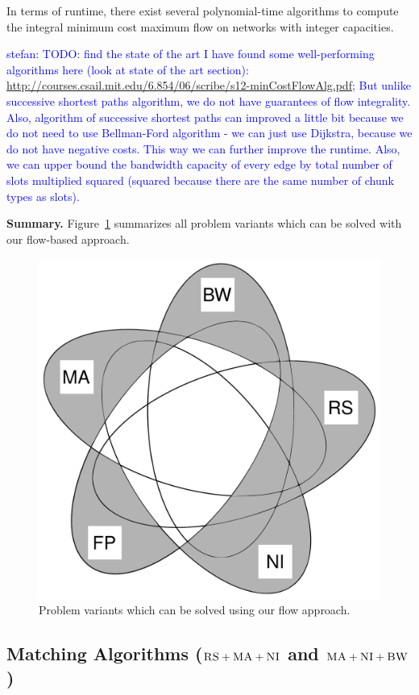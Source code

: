 \documentclass[9pt,twocolumn]{scrartcl}
\newcommand{\stefan}[1]{\textcolor{blue}{stefan: #1}}
\newcommand{\CC}{\textsc{NI}}
\newcommand{\RS}{\textsc{RS}}
\newcommand{\BW}{\textsc{BW}}
\newcommand{\MA}{\textsc{MA}}
\begin{document}
In terms of runtime, there exist several polynomial-time algorithms to compute
the integral minimum cost maximum flow on networks with integer capacities.

\stefan{TODO: find the state of the art
I have found some well-performing algorithms here (look at state of the art section):
  \url{http://courses.csail.mit.edu/6.854/06/scribe/s12-minCostFlowAlg.pdf}; But unlike successive shortest paths algorithm, we do not have guarantees of flow integrality.
Also, algorithm of successive shortest paths can improved a little bit because we do not need to use Bellman-Ford algorithm - we can just use Dijkstra, because we do not have negative costs. This way we can further improve the runtime.
Also, we can upper bound the bandwidth capacity of every edge by total number of slots multiplied squared (squared because there are the same number of chunk types as slots).
}

\textbf{Summary.}
Figure~\ref{fig:venn_flow} summarizes all problem
variants which can be solved with our flow-based approach.
\begin{figure}
\includegraphics[width=\columnwidth]{figs/venn_flow.pdf}
\caption{Problem variants which can be solved using our flow approach.}
\label{fig:venn_flow}
\end{figure}


\subsection{Matching Algorithms ($\RS+\MA+\CC$ and $\MA+\CC+\BW$)}\label{ssec:match}
\end{document}
